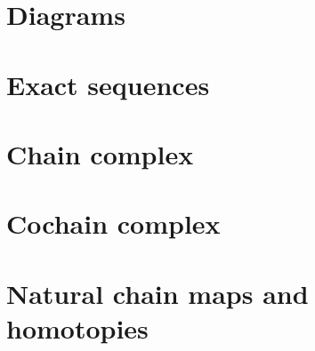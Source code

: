 \documentclass[11pt]{book} %
\begin{document}
\section{Diagrams}
\section{Exact sequences}
\section{Chain complex}
\section{Cochain complex}
\section{Natural chain maps and homotopies}
\end{document}
